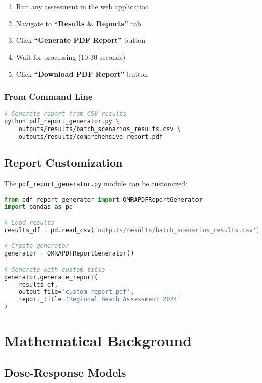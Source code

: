 \documentclass[11pt,a4paper]{article}
\begin{document}
\begin{enumerate}[leftmargin=*]
    \item Run any assessment in the web application
    \item Navigate to \textbf{``Results \& Reports''} tab
    \item Click \textbf{``Generate PDF Report''} button
    \item Wait for processing (10-30 seconds)
    \item Click \textbf{``Download PDF Report''} button
\end{enumerate}

\subsubsection{From Command Line}

\begin{lstlisting}[style=bashstyle, language=bash]
# Generate report from CSV results
python pdf_report_generator.py \
    outputs/results/batch_scenarios_results.csv \
    outputs/results/comprehensive_report.pdf
\end{lstlisting}

\subsection{Report Customization}

The \texttt{pdf\_report\_generator.py} module can be customized:

\begin{lstlisting}[language=Python]
from pdf_report_generator import QMRAPDFReportGenerator
import pandas as pd

# Load results
results_df = pd.read_csv('outputs/results/batch_scenarios_results.csv')

# Create generator
generator = QMRAPDFReportGenerator()

# Generate with custom title
generator.generate_report(
    results_df,
    output_file='custom_report.pdf',
    report_title='Regional Beach Assessment 2024'
)
\end{lstlisting}

\newpage

\section{Mathematical Background}

\subsection{Dose-Response Models}
\end{document}
